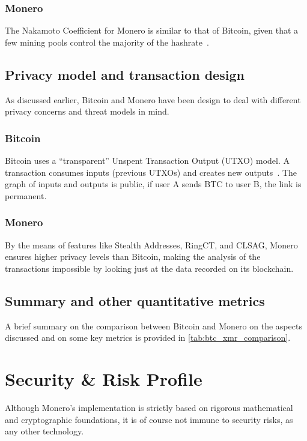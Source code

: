 \documentclass[conference]{IEEEtran}
\begin{document}
\subsubsection{Monero}
The Nakamoto Coefficient for Monero is similar to that of Bitcoin, given that a few mining pools control the majority of the hashrate~\cite{monero_mining_pool_stats}.

\subsection{Privacy model and transaction design}
As discussed earlier, Bitcoin and Monero have been design to deal with different privacy concerns and threat models in mind.

\subsubsection{Bitcoin}
Bitcoin uses a ``transparent'' Unspent Transaction Output (UTXO) model. A transaction consumes inputs (previous UTXOs) and creates new outputs~\cite{bitcoin_utxo}. The graph of inputs and outputs is public, if user A sends BTC to user B, the link is permanent.

\subsubsection{Monero}
By the means of features like Stealth Addresses, RingCT, and CLSAG, Monero ensures higher privacy levels than Bitcoin, making the analysis of the transactions impossible by looking just at the data recorded on its blockchain.

\subsection{Summary and other quantitative metrics}
A brief summary on the comparison between Bitcoin and Monero on the aspects discussed and on some key metrics is provided in \autoref{tab:btc_xmr_comparison}.



\section{Security \& Risk Profile}
Although Monero's implementation is strictly based on rigorous mathematical and cryptographic foundations, it is of course not immune to security risks, as any other technology.
\end{document}
